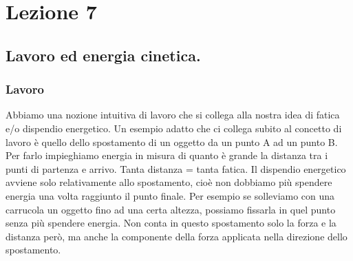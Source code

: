 \chapter{Lezione 7}
\section{Lavoro ed energia cinetica.}
\subsection{Lavoro}
Abbiamo una nozione intuitiva di lavoro che si collega alla nostra idea di fatica e/o dispendio energetico. Un esempio adatto che ci collega subito al concetto di lavoro è quello dello spostamento di un oggetto da un punto A ad un punto B. Per farlo impieghiamo energia in misura di quanto è grande la distanza tra i punti di partenza e arrivo. Tanta distanza = tanta fatica. Il dispendio energetico avviene solo relativamente allo spostamento, cioè non dobbiamo più spendere energia una volta raggiunto il punto finale. Per esempio se solleviamo con una carrucola un oggetto fino ad una certa altezza, possiamo fissarla in quel punto senza più spendere energia. Non conta in questo spostamento solo la forza e la distanza però, ma anche la componente della forza applicata nella direzione dello spostamento. 

